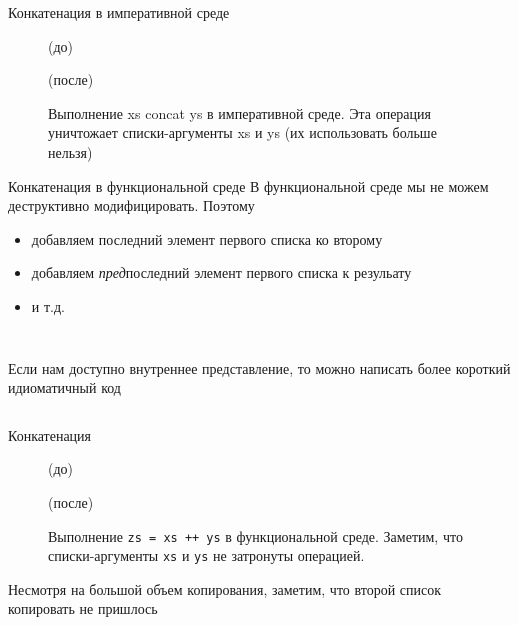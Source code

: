 \documentclass[aspectratio=169
  , xcolor={svgnames}
  , hyperref={ colorlinks,citecolor=DeepPink4
             , linkcolor=DarkRed,urlcolor=DarkBlue}
  , russian
  ]{beamer}
\theoremstyle{exerciseStyle1}
\begin{document}
\begin{frame}[fragile]{Конкатенация в императивной среде}
\begin{figure}[h]
	\par
	(до)\par
	\par
	(после)\par
	\caption{Выполнение xs concat ys в императивной среде. Эта операция уничтожает списки-аргументы xs и ys (их использовать больше нельзя)}
	\label{fig:2.4}
\end{figure}
\end{frame}


\begin{frame}[fragile]{Конкатенация в функциональной среде}
В функциональной среде мы не можем деструктивно модифицировать. Поэтому
\begin{itemize}
\item добавляем последний элемент первого списка ко второму
\item добавляем \emph{пред}последний элемент первого списка к резульату
\item и т.д.
\end{itemize}

\inputminted[firstline=43,lastline=47] {haskell}{code/Stacks.hs}
\end{frame}

\begin{frame}[fragile]{}
\inputminted[firstline=43,lastline=47] {haskell}{code/Stacks.hs}
Если нам доступно внутреннее представление, то можно написать более короткий идиоматичный код
\inputminted[firstline=50,lastline=51] {haskell}{code/Stacks.hs}
\end{frame}

\begin{frame}[fragile]{Конкатенация}
\begin{figure}[h]
	\centering
	\par
	(до)\par
	\vspace{0.5cm}
	\par
	(после)\par
	\vspace{0.5cm}
	\caption{Выполнение \texttt{zs = xs ++ ys} в функциональной среде. Заметим, что списки-аргументы \texttt{xs} и \texttt{ys} не затронуты операцией.
	}
	\label{fig:2.5}
\end{figure}
Несмотря на большой объем копирования, заметим, что второй список копировать не пришлось
\end{frame}
\end{document}
